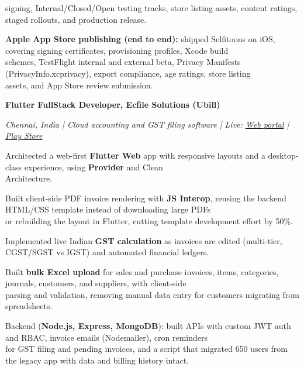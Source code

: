 \documentclass[a4paper]{article}
\newcommand{\asitilde}{{\usefont{8r}{phv}{m}{n}\char126}}
\newcommand{\entryheading}[2]{%
  \par\nointerlineskip
  \vskip 6pt
  \noindent\begingroup
    \fontsize{9}{9.68}\bfseries\selectfont
    #1\hfill\raisebox{0.6pt}{\fontsize{8.4}{9.68}\selectfont #2}\par
  \endgroup
}
\newcommand{\entrysub}[1]{%
  \par\nointerlineskip
  \vskip 1.15pt
  \noindent\begingroup
    \fontsize{8}{9.88}\itshape\selectfont
    #1\par
  \endgroup
}
\newcommand{\live}[2]{\href{#1}{\textcolor{linkblue}{#2}}}
\begin{document}
\begin{rbullets}
    signing, Internal/Closed/Open testing tracks, store listing assets, content ratings, staged rollouts, and production release.
  \item \textbf{Apple App Store publishing (end to end):} shipped Selfitoons on iOS, covering signing certificates, provisioning profiles, Xcode build\\
    schemes, TestFlight internal and external beta, Privacy Manifests (PrivacyInfo.xcprivacy), export compliance, age ratings, store listing\\
    assets, and App Store review submission.
\end{rbullets}

\entryheading{Flutter FullStack Developer, Ecfile Solutions (Ubill)}{Oct 2023 -- Nov 2025}
\entrysub{Chennai, India | Cloud accounting and GST filing software | Live: \live{https://app.ubill.tech/}{Web portal} | \live{https://play.google.com/store/apps/details?id=com.ubill.tech}{Play Store}}

\begin{rbullets}
  \item Architected a web-first \textbf{Flutter Web} app with responsive layouts and a desktop-class experience, using \textbf{Provider} and Clean\\
    Architecture.
  \item Built client-side PDF invoice rendering with \textbf{JS Interop}, reusing the backend HTML/CSS template instead of downloading large PDFs\\
    or rebuilding the layout in Flutter, cutting template development effort by \asitilde 50\%.
  \item Implemented live Indian \textbf{GST calculation} as invoices are edited (multi-tier, CGST/SGST vs IGST) and automated financial ledgers.
  \item Built \textbf{bulk Excel upload} for sales and purchase invoices, items, categories, journals, customers, and suppliers, with client-side\\
    parsing and validation, removing manual data entry for customers migrating from spreadsheets.
  \item Backend (\textbf{Node.js, Express, MongoDB}): built APIs with custom JWT auth and RBAC, invoice emails (Nodemailer), cron reminders\\
    for GST filing and pending invoices, and a script that migrated 650 users from the legacy app with data and billing history intact.
\end{rbullets}
\end{document}

